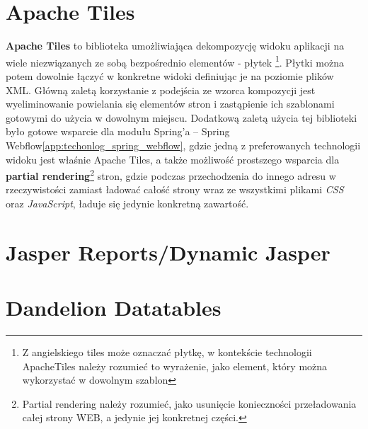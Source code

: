 \section{Apache Tiles}\label{tech:tiles}
	\textbf{Apache Tiles} to biblioteka umożliwiająca dekompozycję widoku aplikacji na wiele niezwiązanych ze sobą bezpośrednio elementów - płytek \footnote{Z angielskiego tiles może oznaczać płytkę, w kontekście technologii ApacheTiles należy rozumieć to wyrażenie, jako element, który można wykorzystać w dowolnym szablon}. Płytki można potem dowolnie łączyć w konkretne widoki definiując je na poziomie plików XML. Główną zaletą korzystanie z podejścia ze wzorca kompozycji jest wyeliminowanie powielania się elementów stron i zastąpienie ich szablonami gotowymi do użycia w dowolnym miejscu. Dodatkową zaletą użycia tej biblioteki było gotowe wsparcie dla modułu Spring’a – Spring Webflow\ref{app:techonlog_spring_webflow}, gdzie jedną z preferowanych technologii widoku jest właśnie Apache Tiles, a także możliwość prostszego wsparcia dla \textbf{partial rendering}\footnote{Partial rendering należy rozumieć, jako usunięcie konieczności przeładowania całej strony WEB, a jedynie jej konkretnej części.} stron, gdzie podczas przechodzenia do innego adresu w rzeczywistości zamiast ładować całość strony wraz ze wszystkimi plikami \textit{CSS} oraz \textit{JavaScript}, ładuje się jedynie konkretną zawartość.
	
\section{Jasper Reports/Dynamic Jasper}
\section{Dandelion Datatables}\label{tech:dandelion}